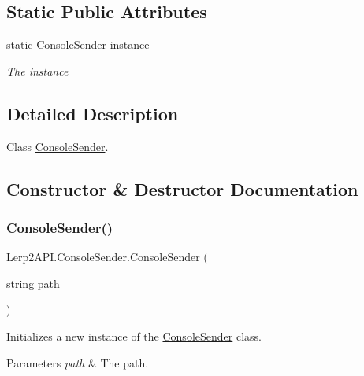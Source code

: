 \subsection*{Static Public Attributes}
\begin{DoxyCompactItemize}
\item 
static \hyperlink{class_lerp2_a_p_i_1_1_console_sender}{Console\+Sender} \hyperlink{class_lerp2_a_p_i_1_1_console_sender_abe27a000639cba703eb80420b6eb5609}{instance}
\begin{DoxyCompactList}\small\item\em The instance \end{DoxyCompactList}\end{DoxyCompactItemize}


\subsection{Detailed Description}
Class \hyperlink{class_lerp2_a_p_i_1_1_console_sender}{Console\+Sender}. 



\subsection{Constructor \& Destructor Documentation}
\mbox{\label{class_lerp2_a_p_i_1_1_console_sender_a9d97c8171ec717937c16ed9d7408062b}} 
\subsubsection{\texorpdfstring{Console\+Sender()}{ConsoleSender()}}
{\footnotesize\ttfamily Lerp2\+A\+P\+I.\+Console\+Sender.\+Console\+Sender (\begin{DoxyParamCaption}\item[{string}]{path }\end{DoxyParamCaption})\hspace{0.3cm}{\ttfamily [inline]}}



Initializes a new instance of the \hyperlink{class_lerp2_a_p_i_1_1_console_sender}{Console\+Sender} class. 


\begin{DoxyParams}{Parameters}
{\em path} & The path.\\
\hline
\end{DoxyParams}


